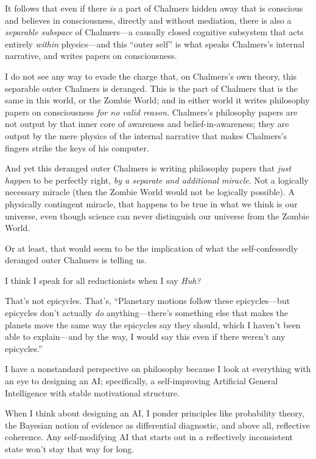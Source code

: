 {
 It follows that even if there \textit{is} a part of Chalmers
hidden away that is conscious and believes in consciousness, directly
and without mediation, there is also a \textit{separable subspace} of
Chalmers---a causally closed cognitive subsystem that acts entirely
\textit{within} physics---and this ``outer
self'' is what speaks Chalmers's
internal narrative, and writes papers on consciousness.}

{
 I do not see any way to evade the charge that, on
Chalmers's own theory, this separable outer Chalmers is
deranged. This is the part of Chalmers that is the same in this world,
or the Zombie World; and in either world it writes philosophy papers on
consciousness \textit{for no valid reason.} Chalmers's
philosophy papers are not output by that inner core of awareness and
belief-in-awareness; they are output by the mere physics of the
internal narrative that makes Chalmers's fingers strike
the keys of his computer.}

{
 And yet this deranged outer Chalmers is writing philosophy papers
that \textit{just happen} to be perfectly right, \textit{by a separate
and additional miracle}. Not a logically necessary miracle (then the
Zombie World would not be logically possible). A physically contingent
miracle, that happens to be true in what we think is our universe, even
though science can never distinguish our universe from the Zombie
World.}

{
 Or at least, that would seem to be the implication of what the
self-confessedly deranged outer Chalmers is telling us.}

{
 I think I speak for all reductionists when I say \textit{Huh?}}

{
 That's not epicycles. That's,
``Planetary motions follow these epicycles---but
epicycles don't actually \textit{do}
anything---there's something else that makes the
planets move the same way the epicycles say they should, which I
haven't been able to explain---and by the way, I would
say this even if there weren't any
epicycles.''}

{
 I have a nonstandard perspective on philosophy because I look at
everything with an eye to designing an AI; specifically, a
self-improving Artificial General Intelligence with stable motivational
structure.}

{
 When I think about designing an AI, I ponder principles like
probability theory, the Bayesian notion of evidence as differential
diagnostic, and above all, reflective coherence. Any self-modifying AI
that starts out in a reflectively inconsistent state
won't stay that way for long.}

